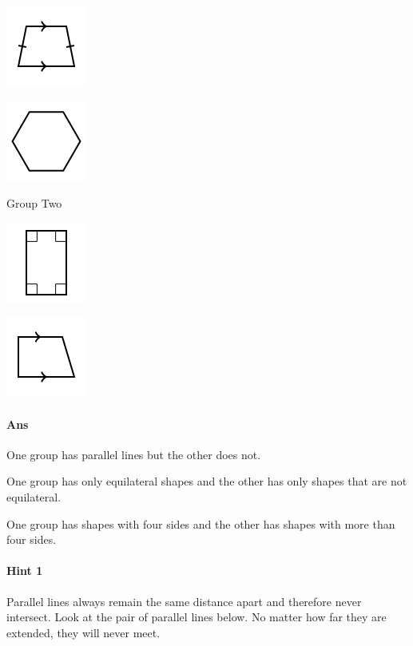 \documentclass[twocolumn,10pt]{article}
\def\shrinkfactor{0.55}
\begin{document}
\includegraphics[scale=\shrinkfactor]{figures/f6970c7834b69ce137488d985cb48d2f38c66936.png}

\includegraphics[scale=\shrinkfactor]{figures/0245164f3f4897772e76d361f955075a80732b03.png}

Group Two


\includegraphics[scale=\shrinkfactor]{figures/de8e97f23717ff840eeffe53dee6e1dc88c119fa.png}

\includegraphics[scale=\shrinkfactor]{figures/53c957e1607d463070480943456fd8435ab45b5d.png}

\paragraph{Ans} 

One group has parallel lines but the other does not.

One group has only equilateral shapes and the other has only shapes that are not equilateral.

One group has shapes with four sides and the other has shapes with more than four sides.


 

\paragraph{Hint 1}Parallel lines always remain the same distance apart and therefore never intersect.  Look at the pair of parallel lines below.  No matter how far they are extended, they will never meet.
\end{document}
